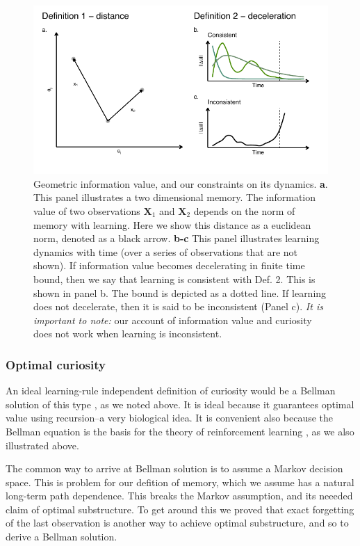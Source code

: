 \begin{figure}
	\begin{fullwidth}
	\includegraphics[width=0.95\linewidth]{img/cartoon.pdf} 
	\caption{Geometric information value, and our constraints on its dynamics. 
	\textbf{a}. This panel illustrates a two dimensional memory. The information value of two observations $\mathbf{X}_1$ and $\mathbf{X}_2$ depends on the norm of memory with learning. Here we show this distance as a euclidean norm, denoted as a black arrow.
	\textbf{b-c} This panel illustrates learning dynamics with time (over a series of observations that are not shown). If information value becomes decelerating in finite time bound, then we say that learning is consistent with Def. 2. This is shown in panel b. The bound is depicted as a dotted line. If learning does not decelerate, then it is said to be inconsistent (Panel c). \textit{It is important to note:} our account of information value and curiosity does not work when learning is inconsistent.
  	}
	\label{fig:cartoon} 
	\end{fullwidth}
\end{figure}

\subsubsection*{Optimal curiosity}
An ideal learning-rule independent definition of curiosity would be a Bellman solution of this type \citep{Bellmann195}, as we noted above. It is ideal because it guarantees optimal value using recursion--a very biological idea. It is convenient also because the Bellman equation is the basis for the theory of reinforcement learning \citep{Sutton2018}, as we also illustrated above. 

The common way to arrive at Bellman solution is to assume a Markov decision space. This is problem for our defition of memory, which we assume has a natural long-term path dependence. This breaks the Markov assumption, and its neeeded claim of optimal substructure. To get around this we proved that exact forgetting of the last observation is another way to achieve optimal substructure, and so to derive a Bellman solution.

